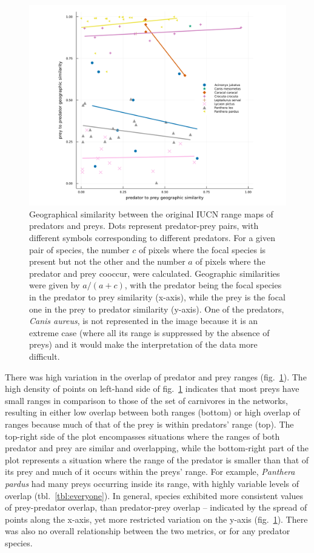 \documentclass[11pt]{article}
\makeatletter
\def\maxwidth{\ifdim\Gin@nat@width>\linewidth\linewidth
\else\Gin@nat@width\fi}
\let\Oldincludegraphics\includegraphics
\renewcommand{\includegraphics}[1]{\Oldincludegraphics[width=\maxwidth]{#1}}
\makeatother
\begin{document}
\begin{figure}
\hypertarget{fig:geo_diss}{%
\centering
\includegraphics{figures/beta-div_pred-species.png}
\caption{Geographical similarity between the original IUCN range maps of
predators and preys. Dots represent predator-prey pairs, with different
symbols corresponding to different predators. For a given pair of
species, the number \(c\) of pixels where the focal species is present
but not the other and the number \(a\) of pixels where the predator and
prey cooccur, were calculated. Geographic similarities were given by
\(a/(a+c)\), with the predator being the focal species in the predator
to prey similarity (x-axis), while the prey is the focal one in the prey
to predator similarity (y-axis). One of the predators, \emph{Canis
aureus}, is not represented in the image because it is an extreme case
(where all its range is suppressed by the absence of preys) and it would
make the interpretation of the data more difficult.}\label{fig:geo_diss}
}
\end{figure}

There was high variation in the overlap of predator and prey ranges
(fig.~\ref{fig:geo_diss}). The high density of points on left-hand side
of fig.~\ref{fig:geo_diss} indicates that most preys have small ranges
in comparison to those of the set of carnivores in the networks,
resulting in either low overlap between both ranges (bottom) or high
overlap of ranges because much of that of the prey is within predators'
range (top). The top-right side of the plot encompasses situations where
the ranges of both predator and prey are similar and overlapping, while
the bottom-right part of the plot represents a situation where the range
of the predator is smaller than that of its prey and much of it occurs
within the preys' range. For example, \emph{Panthera pardus} had many
preys occurring inside its range, with highly variable levels of overlap
(tbl.~\ref{tbl:everyone}). In general, species exhibited more consistent
values of prey-predator overlap, than predator-prey overlap -- indicated
by the spread of points along the x-axis, yet more restricted variation
on the y-axis (fig.~\ref{fig:geo_diss}). There was also no overall
relationship between the two metrics, or for any predator species.
\end{document}
